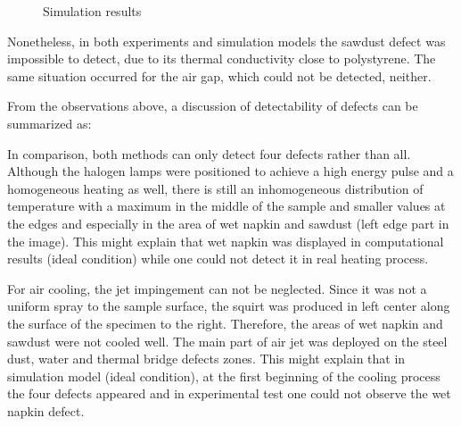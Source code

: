 \begin{figure}
    \hspace{-20pt}
    \hspace{-5pt}
    \caption{Simulation results}
    \label{sim_res}
\end{figure}
Nonetheless, in both experiments and simulation models the sawdust defect was impossible to detect, due to its thermal conductivity close to polystyrene. The same situation occurred for the air gap, which could not be detected, neither.  

From the observations above, a discussion of detectability of defects can be summarized as:

In comparison, both methods can only detect four defects rather than all. Although the halogen lamps were positioned to achieve a high energy pulse and a homogeneous heating as well, there is still an inhomogeneous distribution of temperature with a maximum in the middle of the sample and smaller values at the edges and especially in the area of wet napkin and sawdust (left edge part in the image). This might explain that wet napkin was displayed in computational results (ideal condition) while one could not detect it in real heating process. 

For air cooling, the jet impingement can not be neglected. Since it was not a uniform spray to the sample surface, the squirt was produced in left center along the surface of the specimen to the right. Therefore, the areas of wet napkin and sawdust were not cooled well. The main part of air jet was deployed on the steel dust, water and thermal bridge defects zones. This might explain that in simulation model (ideal condition), at the first beginning of the cooling process the four defects appeared and in experimental test one could not observe the wet napkin defect.


